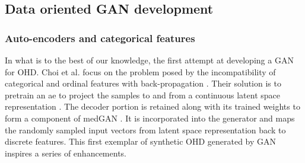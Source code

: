 \subsection{Data oriented GAN development}\label{subsec:data_gan_dev}

\subsubsection{Auto-encoders and categorical features}\label{subsubsec:categorical}
In what is to the best of our knowledge, the first attempt at developing a GAN for OHD. Choi et al. focus on the problem posed by the incompatibility of categorical and ordinal features with back-propagation . Their solution is to pretrain an \gls{ae} to project the samples to and from a continuous latent space representation . The decoder portion is retained along with its trained weights to form a component of medGAN \cite{choi2017generating}. It is incorporated into the generator and maps the randomly sampled input vectors from latent space representation back to discrete features. This first exemplar of synthetic OHD generated by GAN inspires a series of enhancements.\par

